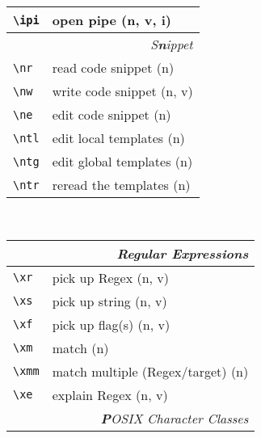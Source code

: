 \documentclass[oneside,10pt,landscape,DIV17]{scrartcl}
\begin{document}
\begin{multicols}{3}
\begin{center}
\begin{tabular}[]{|p{13mm}|p{56mm}|}
\hline \verb'\ipi' & open pipe                 \hfill (n, v, i)\\
\hline
\hline
\multicolumn{2}{|r|}{\textsl{S\textbf{n}ippet}}             \\
\hline \verb'\nr'  & read code snippet         \hfill (n)   \\
\hline \verb'\nw'  & write code snippet        \hfill (n, v)\\
\hline \verb'\ne'  & edit code snippet         \hfill (n)   \\
%
\hline \verb'\ntl' & edit local templates      \hfill (n)   \\
\hline \verb'\ntg' & edit global templates     \hfill (n)   \\
\hline \verb'\ntr' & reread the templates      \hfill (n)   \\
\hline
\end{tabular}\\
%
%
\begin{tabular}[]{|p{11mm}|p{58mm}|}
\hline
\multicolumn{2}{|r|}{\textsl{Regular E\textbf{x}pressions}} \\
\hline \verb'\xr' &  pick up Regex                 \hfill (n, v)\\
\hline \verb'\xs' &  pick up string                \hfill (n, v)\\
\hline \verb'\xf' &  pick up flag(s)               \hfill (n, v)\\
\hline \verb'\xm' &  match                         \hfill (n)   \\
\hline \verb'\xmm'&  match multiple (Regex/target) \hfill (n)   \\
\hline \verb'\xe' &  explain Regex                 \hfill (n, v)\\
\hline
\hline
\multicolumn{2}{|r|}{\textsl{\textbf{P}OSIX Character Classes}}\\

\end{tabular}
\end{center}
\end{multicols}
\end{document}
